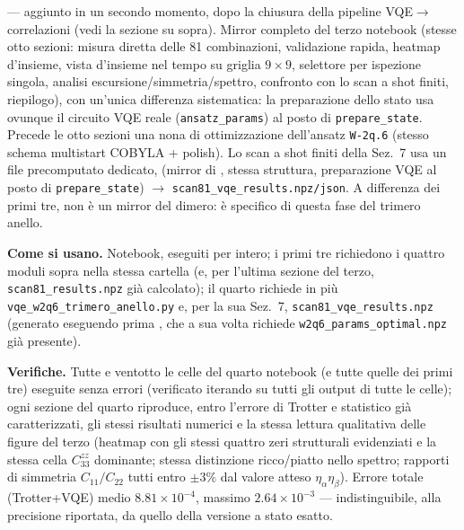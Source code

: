 \documentclass[11pt,a4paper]{article}
\begin{document}
\textbf{\texttt{}} —
aggiunto in un secondo momento, dopo la chiusura della pipeline VQE$\to$correlazioni
(vedi la sezione su \texttt{} sopra). Mirror
completo del terzo notebook (stesse otto sezioni: misura diretta delle 81 combinazioni,
validazione rapida, heatmap d'insieme, vista d'insieme nel tempo su griglia $9\times9$,
selettore per ispezione singola, analisi escursione/simmetria/spettro, confronto con lo
scan a shot finiti, riepilogo), con un'unica differenza sistematica: la preparazione dello
stato usa ovunque il circuito VQE reale (\texttt{ansatz\_params}) al posto di
\texttt{prepare\_state}. Precede le otto sezioni una nona di ottimizzazione dell'ansatz
\texttt{W-2q.6} (stesso schema multistart COBYLA + polish). Lo scan a shot finiti della
Sez.~7 usa un file precomputato dedicato, \texttt{}
(mirror di \texttt{}, stessa struttura, preparazione
VQE al posto di \texttt{prepare\_state}) $\to$ \texttt{scan81\_vqe\_results.npz/json}. A
differenza dei primi tre, non è un mirror del dimero: è specifico di questa fase del
trimero anello.

\textbf{Come si usano.} Notebook, eseguiti per intero; i primi tre richiedono i quattro
moduli sopra nella stessa cartella (e, per l'ultima sezione del terzo,
\texttt{scan81\_results.npz} già calcolato); il quarto richiede in più
\texttt{vqe\_w2q6\_trimero\_anello.py} e, per la sua Sez.~7,
\texttt{scan81\_vqe\_results.npz} (generato eseguendo prima
\texttt{}, che a sua volta richiede
\texttt{w2q6\_params\_optimal.npz} già presente).

\textbf{Verifiche.} Tutte e ventotto le celle del quarto notebook (e tutte quelle dei
primi tre) eseguite senza errori (verificato iterando su tutti gli output di tutte le
celle); ogni sezione del quarto riproduce, entro l'errore di Trotter e statistico già
caratterizzati, gli stessi risultati numerici e la stessa lettura qualitativa delle
figure del terzo (heatmap con gli stessi quattro zeri strutturali evidenziati e la stessa
cella $C_{33}^{zz}$ dominante; stessa distinzione ricco/piatto nello spettro; rapporti di
simmetria $C_{11}/C_{22}$ tutti entro $\pm3\%$ dal valore atteso $\eta_\alpha\eta_\beta$).
Errore totale (Trotter+VQE) medio $8.81\times10^{-4}$, massimo $2.64\times10^{-3}$ —
indistinguibile, alla precisione riportata, da quello della versione a stato esatto.
\end{document}
